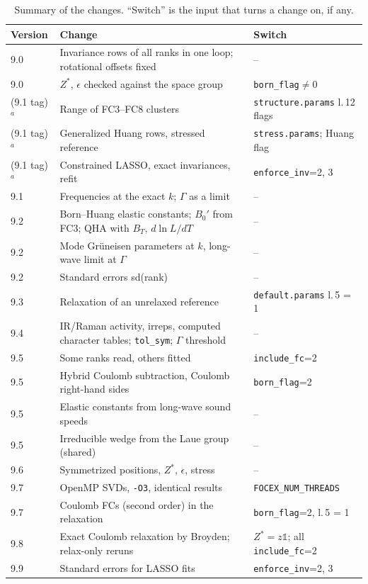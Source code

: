 \documentclass[11pt,a4paper]{article}
\newcommand{\code}[1]{\texttt{#1}}
\begin{document}
\begin{table}[t]
\centering
\caption{Summary of the changes. ``Switch'' is the input that turns a change on, if any.}
\label{tab:summary}
\small
\begin{tabular}{@{}lp{7.6cm}p{4.6cm}@{}}
\toprule
Version & Change & Switch\\
\midrule
9.0 & Invariance rows of all ranks in one loop; rotational offsets fixed & --\\
9.0 & $Z^*$, $\epsilon$ checked against the space group & \code{born\_flag}$\neq0$\\
(9.1 tag)$^a$ & Range of FC3--FC8 clusters & \code{structure.params} l.\,12 flags\\
(9.1 tag)$^a$ & Generalized Huang rows, stressed reference & \code{stress.params}; Huang flag\\
(9.1 tag)$^a$ & Constrained LASSO, exact invariances, refit & \code{enforce\_inv}=2, 3\\
9.1 & Frequencies at the exact $k$; $\Gamma$ as a limit & --\\
9.2 & Born--Huang elastic constants; $B_0'$ from FC3; QHA with $B_T$, $d\ln L/dT$ & --\\
9.2 & Mode Gr\"uneisen parameters at $k$, long-wave limit at $\Gamma$ & --\\
9.2 & Standard errors sd(rank) & --\\
9.3 & Relaxation of an unrelaxed reference & \code{default.params} l.\,5 = 1\\
9.4 & IR/Raman activity, irreps, computed character tables; \code{tol\_sym}; $\Gamma$ threshold & --\\
9.5 & Some ranks read, others fitted & \code{include\_fc}=2\\
9.5 & Hybrid Coulomb subtraction, Coulomb right-hand sides & \code{born\_flag}=2\\
9.5 & Elastic constants from long-wave sound speeds & --\\
9.5 & Irreducible wedge from the Laue group (shared) & --\\
9.6 & Symmetrized positions, $Z^*$, $\epsilon$, stress & --\\
9.7 & OpenMP SVDs, \code{-O3}, identical results & \code{FOCEX\_NUM\_THREADS}\\
9.7 & Coulomb FCs (second order) in the relaxation & \code{born\_flag}=2, l.\,5 = 1\\
9.8 & Exact Coulomb relaxation by Broyden; relax-only reruns & $Z^*=z\mathbb 1$; all \code{include\_fc}=2\\
9.9 & Standard errors for LASSO fits & \code{enforce\_inv}=2, 3\\

\end{tabular}
\end{table}
\end{document}
